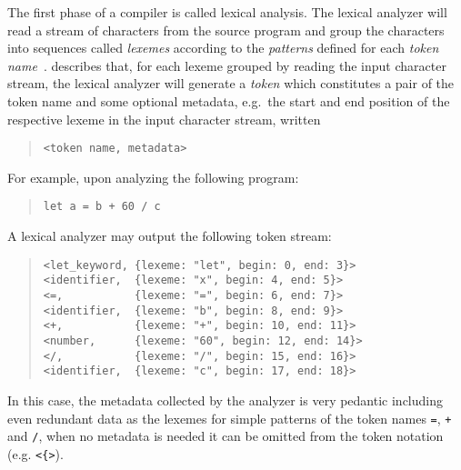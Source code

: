 \documentclass[
    oneside,
    english,
    embeddedlogo,
    noabntexcite
]{ufsc-thesis-rn46-2019}
\begin{document}
The first phase of a compiler is called lexical analysis.
The lexical analyzer will read a stream of characters from the source program and group the characters into sequences called \textit{lexemes} according to the \textit{patterns} defined for each \textit{token name}~\cite{Aho:2006:CPT:1177220}.
\textcite{Aho:2006:CPT:1177220} describes that, for each lexeme grouped by reading the input character stream, the lexical analyzer will generate a \textit{token} which constitutes a pair of the token name and some optional metadata, e.g.\ the start and end position of the respective lexeme in the input character stream, written
\begin{quote}
    \begin{verbatim}
<token name, metadata>
\end{verbatim}
\end{quote}
For example, upon analyzing the following program:
\begin{quote}
    \begin{verbatim}
let a = b + 60 / c
\end{verbatim}
\end{quote}
A lexical analyzer may output the following token stream:
\begin{quote}\label{figure:introduction_token_stream}
    \begin{verbatim}
<let_keyword, {lexeme: "let", begin: 0, end: 3}>
<identifier,  {lexeme: "x", begin: 4, end: 5}>
<=,           {lexeme: "=", begin: 6, end: 7}>
<identifier,  {lexeme: "b", begin: 8, end: 9}>
<+,           {lexeme: "+", begin: 10, end: 11}>
<number,      {lexeme: "60", begin: 12, end: 14}>
</,           {lexeme: "/", begin: 15, end: 16}>
<identifier,  {lexeme: "c", begin: 17, end: 18}>
\end{verbatim}
\end{quote}
In this case, the metadata collected by the analyzer is very pedantic including even redundant data as the lexemes for simple patterns of the token names \verb+=+, \verb-+- and \verb+/+, when no metadata is needed it can be omitted from the token notation (e.g. \verb+<{>+).
\end{document}
